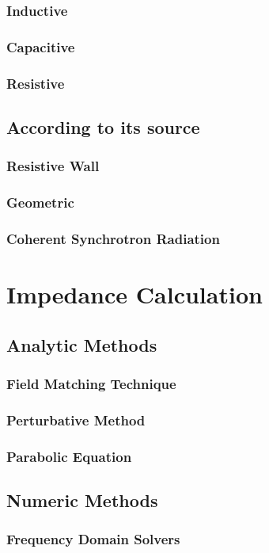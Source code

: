 \documentclass[
	12pt,				%
	openright,			%
	oneside,			%
	a4paper,		%
	chapter=TITLE,		%
	section=TITLE,		%
    brazil,				%
	english,			%
	sumario=tradicional,
	]{abntex2}
\begin{document}
      \subsubsection{Inductive}
      \subsubsection{Capacitive}
      \subsubsection{Resistive}
    \subsection{According to its source}
      \subsubsection{Resistive Wall}
      \subsubsection{Geometric}
      \subsubsection{Coherent Synchrotron Radiation}
  \section{Impedance Calculation}
    \subsection{Analytic Methods}
      \subsubsection{Field Matching Technique}
      \subsubsection{Perturbative Method}
      \subsubsection{Parabolic Equation}
    \subsection{Numeric Methods}
      \subsubsection{Frequency Domain Solvers}
\end{document}
